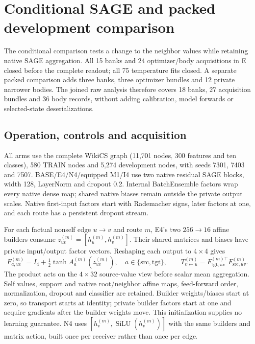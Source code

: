 \section{Conditional SAGE and packed development comparison}\label{app:E-PE}
The conditional comparison tests a change to the neighbor values while retaining native SAGE aggregation. All 15 banks and 24 optimizer/body acquisitions in E closed before the complete readout; all 75 temperature fits closed. A separate packed comparison adds three banks, three optimizer bundles and 12 private narrower bodies. The joined raw analysis therefore covers 18 banks, 27 acquisition bundles and 36 body records, without adding calibration, model forwards or selected-state deserializations.

\subsection{Operation, controls and acquisition}
All arms use the complete WikiCS graph (11,701 nodes, 300 features and ten classes), 580 TRAIN nodes and 5,274 development nodes, with seeds 7301, 7403 and 7507. BASE/E4/N4/equipped M1/I4 use two native residual SAGE blocks, width 128, LayerNorm and dropout 0.2. Internal BatchEnsemble factors wrap every native dense map; shared native biases remain outside the private output scales. Native first-input factors start with Rademacher signs, later factors at one, and each route has a persistent dropout stream.

For each factual nonself edge $u\to v$ and route $m$, E4's two $256\to16$ affine builders consume $z_{uv}^{(m)}=[h_u^{(m)},h_v^{(m)}]$. Their shared matrices and biases have private input/output factor vectors. Reshaping each output to $4\times4$ gives
\begin{equation}\label{eq:E-paired-maps}
F_{a,uv}^{(m)}=I_4+\tfrac12\tanh A_a^{(m)}(z_{uv}^{(m)}),\quad a\in\{\mathrm{src},\mathrm{tgt}\},\qquad
T_{v\leftarrow u}^{(m)}=F_{\mathrm{tgt},uv}^{(m)\top}F_{\mathrm{src},uv}^{(m)}.
\end{equation}
The product acts on the $4\times32$ source-value view before scalar mean aggregation. Self values, support and native root/neighbor affine maps, feed-forward order, normalization, dropout and classifier are retained. Builder weights/biases start at zero, so transport starts at identity; private builder factors start at one and acquire gradients after the builder weights move. This initialization supplies no learning guarantee. N4 uses $[h_v^{(m)},\operatorname{SiLU}(h_v^{(m)})]$ with the same builders and matrix action, built once per receiver rather than once per edge.

